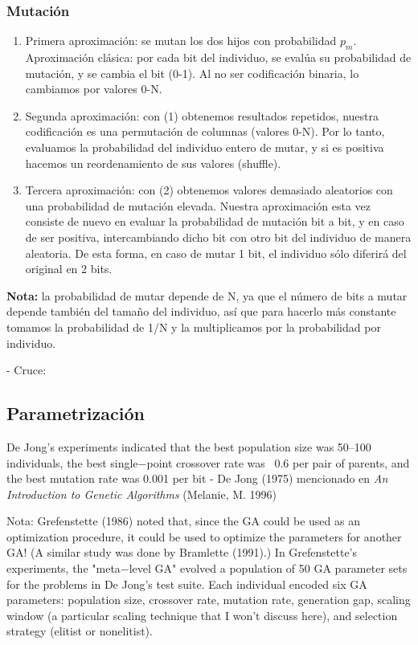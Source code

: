 \documentclass[12pt]{article}
\begin{document}
\subsubsection{Mutación}

\begin{enumerate}
    \item Primera aproximación: se mutan los dos hijos con probabilidad $p_m$. Aproximación clásica: por cada bit del individuo, se evalúa su probabilidad de mutación, y se cambia el bit (0-1). Al no ser codificación binaria, lo cambiamos por valores 0-N.
    \item Segunda aproximación: con (1) obtenemos resultados repetidos, nuestra codificación es una permutación de columnas (valores 0-N). Por lo tanto, evaluamos la probabilidad del individuo entero de mutar, y si es positiva hacemos un reordenamiento de sus valores (shuffle).
    \item Tercera aproximación: con (2) obtenemos valores demasiado aleatorios con una probabilidad de mutación elevada. Nuestra aproximación esta vez consiste de nuevo en evaluar la probabilidad de mutación bit a bit, y en caso de ser positiva, intercambiando dicho bit con otro bit del individuo de manera aleatoria. De esta forma, en caso de mutar 1 bit, el individuo sólo diferirá del original en 2 bits.
    
\end{enumerate}
\textbf{Nota:}
la probabilidad de mutar depende de N, ya que el número de bits a mutar depende también del tamaño del individuo, así que para hacerlo más constante tomamos la probabilidad de 1/N y la multiplicamos por la probabilidad por individuo.


- Cruce:


\subsection{Parametrización}

De Jong's experiments indicated that the best population size was 50–100 individuals, the best single−point crossover rate was ~0.6 per pair of parents, and the best mutation rate was 0.001 per bit - De Jong (1975) mencionado en \emph{An Introduction to Genetic Algorithms} (Melanie, M. 1996) 

Nota:  Grefenstette (1986) noted that, since the GA could be used as an optimization procedure, it could be used to optimize the parameters for another GA! (A similar study was done by Bramlette (1991).) In Grefenstette's experiments, the "meta−level GA" evolved a population of 50 GA parameter sets for the problems in De Jong's test suite. Each individual encoded six GA parameters: population size, crossover rate, mutation rate, generation gap, scaling window (a particular scaling technique that I won't discuss here), and selection strategy (elitist or nonelitist).
\end{document}
